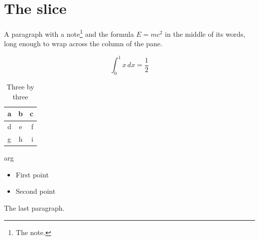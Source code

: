 \documentclass{article}
\begin{document}
\section{The slice}

A paragraph with a note\footnote{The note.} and the formula $E = mc^2$ in the middle of its words, long enough to wrap across the column of the pane.

\begin{equation}
\int_0^1 x \, dx = \frac{1}{2}
\label{eq:half}
\end{equation}

\begin{table}[h]
\centering
\caption{Three by three}
\begin{tabular}{|l|c|r|}
\hline
a & b & c \\
\hline
d & e & f \\
g & h & i \\
\hline
\end{tabular}
\end{table}

\begin{unknownthing}[opt]{arg}
\end{unknownthing}

\begin{itemize}
\item First point
\item Second point
\end{itemize}

The last paragraph.
\end{document}
